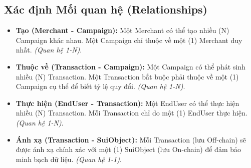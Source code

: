 \subsection{Xác định Mối quan hệ (Relationships)}
\begin{itemize}
    \item \textbf{Tạo (Merchant - Campaign):} Một Merchant có thể tạo nhiều (N) Campaign khác nhau. Một Campaign chỉ thuộc về một (1) Merchant duy nhất. \textit{(Quan hệ 1-N)}.
    \item \textbf{Thuộc về (Transaction - Campaign):} Một Campaign có thể phát sinh nhiều (N) Transaction. Một Transaction bắt buộc phải thuộc về một (1) Campaign cụ thể để biết tỷ lệ quy đổi. \textit{(Quan hệ 1-N)}.
    \item \textbf{Thực hiện (EndUser - Transaction):} Một EndUser có thể thực hiện nhiều (N) Transaction. Mỗi Transaction chỉ do một (1) EndUser thực hiện. \textit{(Quan hệ 1-N)}.
    \item \textbf{Ánh xạ (Transaction - SuiObject):} Mỗi Transaction (lưu Off-chain) sẽ được ánh xạ chính xác với một (1) SuiObject (lưu On-chain) để đảm bảo minh bạch dữ liệu. \textit{(Quan hệ 1-1)}.
\end{itemize}